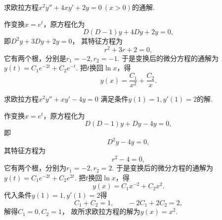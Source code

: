 \begin{example}
求欧拉方程\(x^2 y'' + 4 x y' + 2 y = 0\ (x>0)\)的通解.
\begin{solution}
作变换\(x = e^t\)，原方程化为\begin{equation*}
	D(D-1)y + 4 Dy + 2y = 0,
\end{equation*}
即\(D^2y + 3 Dy + 2y = 0\)，
其特征方程为\begin{equation*}
	r^2 + 3r + 2 = 0,
\end{equation*}
它有两个根，分别是\(r_1 = -2,r_2 = -1\).
于是变换后的微分方程的通解为\(y(t) = C_1 e^{-2t} + C_2 e^{-t}\).
把\(t\)换回\(\ln x\)，得\begin{equation*}
	y(x) = \frac{C_1}{x^2} + \frac{C_2}{x}.
\end{equation*}
\end{solution}
\end{example}
\begin{example}
求欧拉方程\(x^2 y'' + x y' - 4 y = 0\)
满足条件\(y(1) = 1,y'(1) = 2\)的解.
\begin{solution}
作变换\(x = e^t\)，原方程化为\begin{equation*}
	D(D-1)y + Dy - 4y = 0,
\end{equation*}
即\begin{equation*}
	D^2y - 4y = 0,
\end{equation*}
其特征方程为\begin{equation*}
	r^2 - 4 = 0,
\end{equation*}
它有两个根，分别为\(r_1 = -2,r_2 = 2\).
于是变换后的微分方程的通解为\(y(t) = C_1 e^{-2t} + C_2 e^{2t}\).
把\(t\)换回\(\ln x\)，得\begin{equation*}
	y(x) = C_1 x^{-2} + C_2 x^2.
\end{equation*}
代入条件\(y(1) = 1,y'(1) = 2\)得\begin{equation*}
	C_1 + C_2 = 1,
	\qquad
	-2 C_1 + 2 C_2 = 2,
\end{equation*}
解得\(C_1 = 0,C_2 = 1\)，
故所求欧拉方程的解为\(y(x) = x^2\).
\end{solution}
\end{example}
